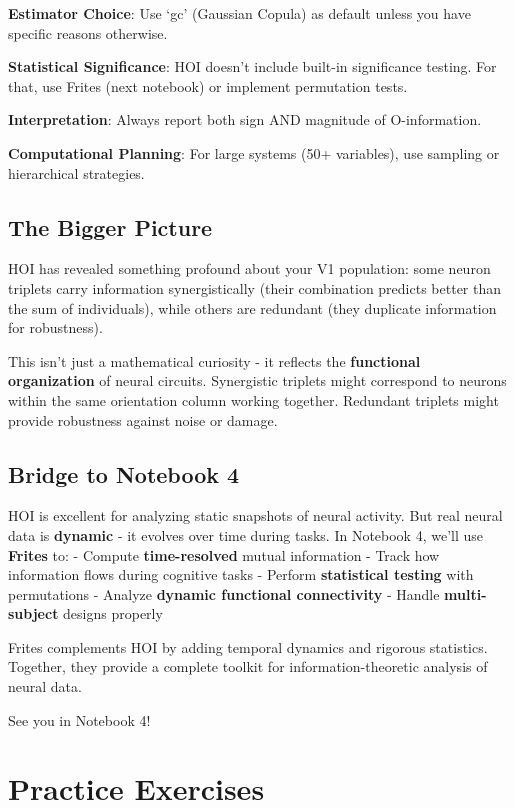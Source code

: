 \documentclass[
  11pt,
  letterpaper,
  oneside,
  openany]{book}
\begin{document}
\textbf{Estimator Choice}: Use `gc' (Gaussian Copula) as default unless
you have specific reasons otherwise.

\textbf{Statistical Significance}: HOI doesn't include built-in
significance testing. For that, use Frites (next notebook) or implement
permutation tests.

\textbf{Interpretation}: Always report both sign AND magnitude of
O-information.

\textbf{Computational Planning}: For large systems (50+ variables), use
sampling or hierarchical strategies.

\subsection{The Bigger Picture}\label{the-bigger-picture}

HOI has revealed something profound about your V1 population: some
neuron triplets carry information synergistically (their combination
predicts better than the sum of individuals), while others are redundant
(they duplicate information for robustness).

This isn't just a mathematical curiosity - it reflects the
\textbf{functional organization} of neural circuits. Synergistic
triplets might correspond to neurons within the same orientation column
working together. Redundant triplets might provide robustness against
noise or damage.

\subsection{Bridge to Notebook 4}\label{bridge-to-notebook-4}

HOI is excellent for analyzing static snapshots of neural activity. But
real neural data is \textbf{dynamic} - it evolves over time during
tasks. In Notebook 4, we'll use \textbf{Frites} to: - Compute
\textbf{time-resolved} mutual information - Track how information flows
during cognitive tasks - Perform \textbf{statistical testing} with
permutations - Analyze \textbf{dynamic functional connectivity} - Handle
\textbf{multi-subject} designs properly

Frites complements HOI by adding temporal dynamics and rigorous
statistics. Together, they provide a complete toolkit for
information-theoretic analysis of neural data.

See you in Notebook 4! 🚀

\section{Practice Exercises}\label{practice-exercises-1}
\end{document}
